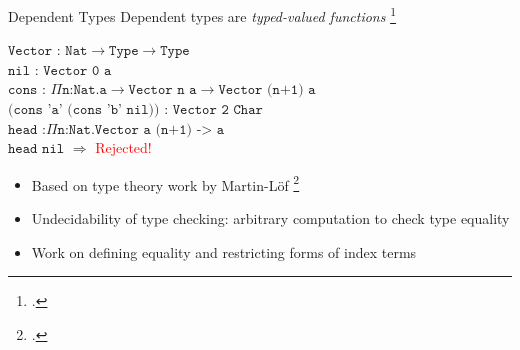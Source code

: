 \documentclass[aspectratio=169]{beamer}
\begin{document}
\begin{frame}{Dependent Types}
    Dependent types are \emph{typed-valued functions} \footcite{pierce_advanced_2005}
\pause
\begin{center}
   $\texttt{Vector : Nat}\rightarrow\texttt{Type}\rightarrow\texttt{Type}$
   \pause
   \\
   $\texttt{nil : Vector 0 a}$
   \\
   \pause
   $\texttt{cons : }\Pi\texttt{n:Nat.a}\rightarrow\texttt{Vector n a}\rightarrow\texttt{Vector (n+1) a}$
   \\
   \pause
   $\texttt{(cons 'a' (cons 'b' nil)) : Vector 2 Char}$
   \\
   \pause
   $\texttt{head :}\Pi\texttt{n:Nat.Vector a (n+1) -> a}$
   \\
   \pause
   $\texttt{head nil}$ \pause $\Rightarrow$ \textcolor{red}{Rejected!}
\end{center}
    \pause
    \begin{itemize}
        \item Based on type theory work by Martin-L{\"o}f \footcite{martin-lof_constructive_1984}
        \item \alert{Undecidability} of type checking: arbitrary computation to check type equality
        \item Work on defining equality and restricting forms of index terms
    \end{itemize}
    \vspace{0.1in}
\end{frame}
\end{document}

